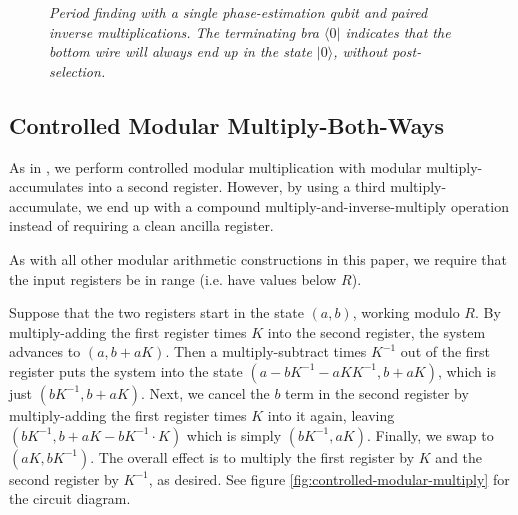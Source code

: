 \documentclass[twocolumn]{article}
\begin{document}
\begin{figure}
  \centering
  \caption{\em
	Period finding with a single phase-estimation qubit and paired inverse multiplications.
	The terminating bra $\langle 0 |$ indicates that the bottom wire will always end up in the state $|0\rangle$, without post-selection.
  }
  \label{fig:period-finding-solo-phase-qubit-explicit-dirty-register}
\end{figure}

\subsection{Controlled Modular Multiply-Both-Ways}

As in \cite{beauregard2003}, we perform controlled modular multiplication with modular multiply-accumulates into a second register.
However, by using a third multiply-accumulate, we end up with a compound multiply-and-inverse-multiply operation instead of requiring a clean ancilla register.

As with all other modular arithmetic constructions in this paper, we require that the input registers be in range (i.e. have values below $R$).

Suppose that the two registers start in the state $(a, b)$, working modulo $R$.
By multiply-adding the first register times $K$ into the second register, the system advances to $(a, b+aK)$.
Then a multiply-subtract times $K^{-1}$ out of the first register puts the system into the state $(a-bK^{-1}-aKK^{-1}, b+aK)$, which is just $(bK^{-1}, b+aK)$.
Next, we cancel the $b$ term in the second register by multiply-adding the first register times $K$ into it again, leaving $(bK^{-1}, b+aK-bK^{-1} \cdot K)$ which is simply $(bK^{-1}, aK)$.
Finally, we swap to $(aK, bK^{-1})$.
The overall effect is to multiply the first register by $K$ and the second register by $K^{-1}$, as desired.
See figure \ref{fig:controlled-modular-multiply} for the circuit diagram.
\end{document}
